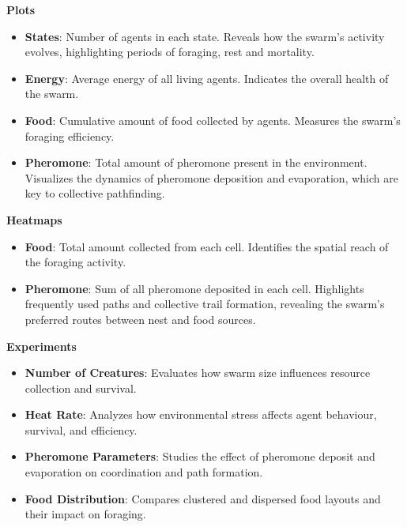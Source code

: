 \documentclass[11pt]{article}
\begin{document}
\textbf{Plots}
\begin{itemize}[leftmargin=16pt]
    \item \textbf{States}: Number of agents in each state. Reveals how the swarm’s activity evolves, highlighting periods of foraging, rest and mortality.
    \item \textbf{Energy}: Average energy of all living agents. Indicates the overall health of the swarm.
    \item \textbf{Food}: Cumulative amount of food collected by agents. Measures the swarm’s foraging efficiency.
    \item \textbf{Pheromone}: Total amount of pheromone present in the environment. Visualizes the dynamics of pheromone deposition and evaporation, which are key to collective pathfinding.
\end{itemize}

\textbf{Heatmaps}
\begin{itemize}[leftmargin=16pt]
    \item \textbf{Food}: Total amount collected from each cell. Identifies the spatial reach of the foraging activity.
    \item \textbf{Pheromone}: Sum of all pheromone deposited in each cell. Highlights frequently used paths and collective trail formation, revealing the swarm’s preferred routes between nest and food sources.
\end{itemize}

\textbf{Experiments}


\begin{itemize}[leftmargin=16pt]
    \item \textbf{Number of Creatures}: Evaluates how swarm size influences resource collection and survival.
    \item \textbf{Heat Rate}: Analyzes how environmental stress affects agent behaviour, survival, and efficiency.
    \item \textbf{Pheromone Parameters}: Studies the effect of pheromone deposit and evaporation on coordination and path formation.
    \item \textbf{Food Distribution}: Compares clustered and dispersed food layouts and their impact on foraging.
\end{itemize}

\end{document}
